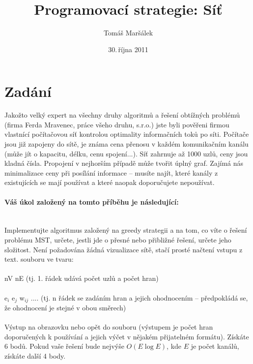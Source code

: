 \documentclass[11pt]{article}
\title{Programovací strategie: Síť}
\author{Tomáš Maršálek}
\date{30.\,října 2011}
\begin{document}
\maketitle

\section{Zadání}
Jakožto velký expert na všechny druhy algoritmů a řešení obtížných problémů
(firma Ferda Mravenec, práce všeho druhu, s.r.o.) jste byli pověřeni firmou
vlastnící počítačovou síť kontrolou optimality informačních toků po síti.
Počítače jsou již zapojeny do sítě, je známa cena přenosu v každém komunikačním
kanálu (může jít o kapacitu, délku, cenu spojení...). Síť zahrnuje až 1000
uzlů, ceny jsou kladná čísla. Propojení v nejhorším případě může tvořit úplný
graf. Zajímá nás minimalizace ceny při posílání informace – musíte najít, které
kanály z existujících se mají používat a které naopak doporučujete nepoužívat.

\paragraph{Váš úkol založený na tomto příběhu je následující:} 
\mbox{} \\
\indent
Implementujte algoritmus založený na greedy strategii a na tom, co víte o
řešení problému MST, určete, jestli jde o přesné nebo přibližné řešení, určete
jeho složitost. Není požadována žádná vizualizace sítě, stačí prosté načtení
vstupu z text. souboru ve tvaru:
 
\paragraph{}
nV nE  (tj. 1. řádek udává počet uzlů a počet hran)
\paragraph{}
e$_i$ e$_j$ w$_{ij}$ .... (tj. n řádek se zadáním hran a jejich ohodnocením –
předpokládá se, že ohodnocení je stejné v obou směrech)
 
\paragraph{}
Výstup na obrazovku nebo opět do souboru (výstupem je počet hran doporučených k
používání a jejich výčet v nějakém přijatelném formátu). Získáte 6 bodů. Pokud
vaše řešení bude nejvýše $O(E \log E)$, kde $E$ je počet kanálů,  získáte další
4 body.
\end{document}
